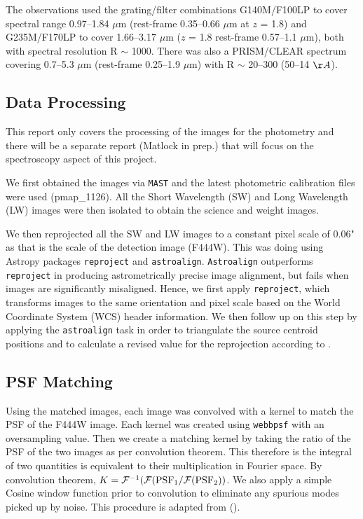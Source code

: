 \documentclass[twocolumn,linenumbers]{aastex631}
\begin{document}
The observations used the grating/filter combinations G140M/F100LP to cover spectral range 0.97–1.84 $\mu $m (rest-frame 0.35–0.66 $\mu$m at $z$ = 1.8) and G235M/F170LP to cover 1.66–3.17 $\mu$m ($z$ = 1.8 rest-frame 0.57–1.1 $\mu$m), both with spectral resolution R $\sim$ 1000. There was also a PRISM/CLEAR spectrum covering 0.7–5.3 $\mu$m (rest-frame 0.25–1.9 $\mu$m) with R $\sim$ 20–300 (50–14 $\AA$).

\subsection{Data Processing} \label{sec:process}
This report only covers the processing of the images for the photometry and there will be a separate report (Matlock in prep.) that will focus on the spectroscopy aspect of this project.

We first obtained the images via \texttt{MAST} and the latest photometric calibration files were used (pmap\_1126). All the Short Wavelength (SW) and Long Wavelength (LW) images were then isolated to obtain the science and weight images.

We then reprojected all the SW and LW images to a constant pixel scale of 0.06" as that is the scale of the detection image (F444W). This was doing using Astropy packages \texttt{reproject} and \texttt{astroalign}. \texttt{Astroalign} outperforms \texttt{reproject} in producing astrometrically precise image alignment, but fails when images are significantly misaligned. Hence, we first apply \texttt{reproject}, which transforms images to the same orientation and pixel scale based on the World Coordinate System (WCS) header information. We then follow up on this step by applying the \texttt{astroalign} task in order to triangulate the source centroid positions and to calculate a revised value for the reprojection according to \cite{2020A&C....3200384B}. 

\subsection{PSF Matching} \label{sec:psf}
Using the matched images, each image was convolved with a kernel to match the PSF of the F444W image. Each kernel was created using \texttt{webbpsf} with an oversampling value. Then we create a matching kernel by taking the ratio of the PSF of the two images as per convolution theorem. This therefore is the integral of two quantities is equivalent to their multiplication in Fourier space. 
By convolution theorem,
    $K = \mathcal{F}^{-1}(\mathcal{F}(\rm{PSF_1}/\mathcal{F}(\rm{PSF_2}))$. 
We also apply a simple Cosine window function prior to convolution to eliminate any spurious modes picked up by noise.
This procedure is adapted from (\cite{pascale2022possible}). %
\end{document}
